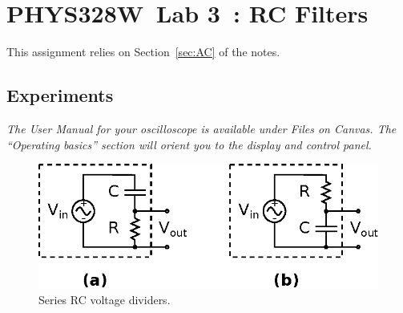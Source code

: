 \documentclass[11pt]{article}
\newcommand{\COURSE}{PHYS328W}
\newcommand{\LABNUM}{3}
\newcommand{\TITLE}{RC Filters}
\begin{document}
\thispagestyle{empty}

\section*{\COURSE\ Lab \LABNUM\ : \TITLE}

This assignment relies on Section~\ref{sec:AC} of the notes.

\subsection*{Experiments}

\emph{The User Manual for your oscilloscope is available under Files
  on Canvas. The ``Operating basics'' section will orient you to the 
  display and control panel.}

\begin{figure}[h]
\centering
\includegraphics{rcvdividers.eps}
\caption{Series RC voltage dividers.}
\label{fig:rcvdividers}
\end{figure}
\end{document}
